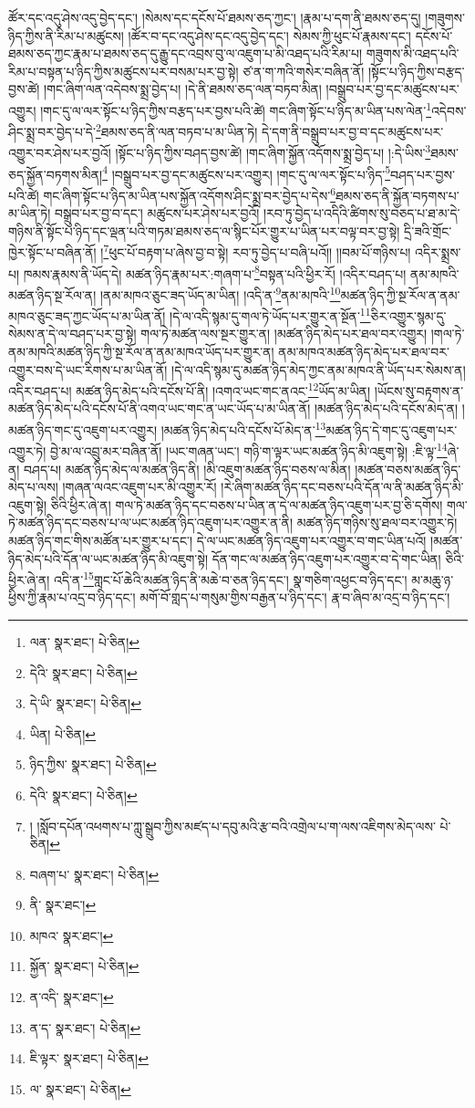 ཚོར་དང་འདུ་ཤེས་འདུ་བྱེད་དང་། །སེམས་དང་དངོས་པོ་ཐམས་ཅད་ཀྱང་། །རྣམ་པ་དག་ནི་ཐམས་ཅད་དུ། །གཟུགས་ཉིད་ཀྱིས་ནི་རིམ་པ་མཚུངས། །ཚོར་བ་དང་འདུ་ཤེས་དང་འདུ་བྱེད་དང་། སེམས་ཀྱི་ཕུང་པོ་རྣམས་དང་། དངོས་པོ་ཐམས་ཅད་ཀྱང་རྣམ་པ་ཐམས་ཅད་དུ་རྒྱུ་དང་འབྲས་བུ་ལ་འཇུག་པ་མི་འཐད་པའི་རིམ་པ། གཟུགས་མི་འཐད་པའི་རིམ་པ་བསྟན་པ་ཉིད་ཀྱིས་མཚུངས་པར་བསམ་པར་བྱ་སྟེ། ཙ་ན་ག་ཀའི་གསེར་བཞིན་ནོ། །སྟོང་པ་ཉིད་ཀྱིས་བརྩད་བྱས་ཚེ། །གང་ཞིག་ལན་འདེབས་སྨྲ་བྱེད་པ། །དེ་ནི་ཐམས་ཅད་ལན་བཏབ་མིན། །བསྒྲུབ་པར་བྱ་དང་མཚུངས་པར་འགྱུར། །གང་དུ་ལ་ལར་སྟོང་པ་ཉིད་ཀྱིས་བརྩད་པར་བྱས་པའི་ཚེ། གང་ཞིག་སྟོང་པ་ཉིད་མ་ཡིན་པས་ལེན་\footnote{ལན་  སྣར་ཐང་།  པེ་ཅིན། }འདེབས་ཤིང་སྨྲ་བར་བྱེད་པ་དེ་\footnote{དེའི་  སྣར་ཐང་།  པེ་ཅིན། }ཐམས་ཅད་ནི་ལན་བཏབ་པ་མ་ཡིན་ཏེ། དེ་དག་ནི་བསྒྲུབ་པར་བྱ་བ་དང་མཚུངས་པར་འགྱུར་བར་ཤེས་པར་བྱའོ། །སྟོང་པ་ཉིད་ཀྱིས་བཤད་བྱས་ཚེ། །གང་ཞིག་སྐྱོན་འདོགས་སྨྲ་བྱེད་པ། །:དེ་ཡིས་\footnote{དེ་ཡི་  སྣར་ཐང་།  པེ་ཅིན། }ཐམས་ཅད་སྐྱོན་བཏགས་མིན།\footnote{ཡིན།  པེ་ཅིན། } །བསྒྲུབ་པར་བྱ་དང་མཚུངས་པར་འགྱུར། །གང་དུ་ལ་ལར་སྟོང་པ་ཉིད་\footnote{ཉིད་ཀྱིས་  སྣར་ཐང་།  པེ་ཅིན། }བཤད་པར་བྱས་པའི་ཚེ། གང་ཞིག་སྟོང་པ་ཉིད་མ་ཡིན་པས་སྐྱོན་འདོགས་ཤིང་སྨྲ་བར་བྱེད་པ་དེས་\footnote{དེའི་  སྣར་ཐང་།  པེ་ཅིན། }ཐམས་ཅད་ནི་སྐྱོན་བཏགས་པ་མ་ཡིན་ཏེ། བསྒྲུབ་པར་བྱ་བ་དང་། མཚུངས་པར་ཤེས་པར་བྱའོ། །རབ་ཏུ་བྱེད་པ་འདིའི་ཚིགས་སུ་བཅད་པ་ཐ་མ་དེ་གཉིས་ནི་སྟོང་པ་ཉིད་དང་ལྡན་པའི་གཏམ་ཐམས་ཅད་ལ་སྙིང་པོར་གྱུར་པ་ཡིན་པར་བལྟ་བར་བྱ་སྟེ། དྲི་ཟའི་གྲོང་ཁྱེར་སྟོང་པ་བཞིན་ནོ། །\footnote{། །སློབ་དཔོན་འཕགས་པ་ཀླུ་སྒྲུབ་ཀྱིས་མཛད་པ་དབུ་མའི་རྩ་བའི་འགྲེལ་པ་ག་ལས་འཇིགས་མེད་ལས་  པེ་ཅིན། }ཕུང་པོ་བརྟག་པ་ཞེས་བྱ་བ་སྟེ། རབ་ཏུ་བྱེད་པ་བཞི་པའོ།། །།བམ་པོ་གཉིས་པ། འདིར་སྨྲས་པ། ཁམས་རྣམས་ནི་ཡོད་དེ། མཚན་ཉིད་རྣམ་པར་:གཞག་པ་\footnote{བཞག་པ་  སྣར་ཐང་།  པེ་ཅིན། }བསྟན་པའི་ཕྱིར་རོ། །འདིར་བཤད་པ། ནམ་མཁའི་མཚན་ཉིད་སྔ་རོལ་ན། །ནམ་མཁའ་ཅུང་ཟད་ཡོད་མ་ཡིན། །འདི་ན་\footnote{ནི་  སྣར་ཐང་། }ནམ་མཁའི་\footnote{མཁའ་  སྣར་ཐང་། }མཚན་ཉིད་ཀྱི་སྔ་རོལ་ན་ནམ་མཁའ་ཅུང་ཟད་ཀྱང་ཡོད་པ་མ་ཡིན་ནོ། །དེ་ལ་འདི་སྙམ་དུ་གལ་ཏེ་ཡོད་པར་གྱུར་ན་སྔོན་\footnote{སྐྱོན་  སྣར་ཐང་།  པེ་ཅིན། }ཅིར་འགྱུར་སྙམ་དུ་སེམས་ན་དེ་ལ་བཤད་པར་བྱ་སྟེ། གལ་ཏེ་མཚན་ལས་སྔར་གྱུར་ན། །མཚན་ཉིད་མེད་པར་ཐལ་བར་འགྱུར། །གལ་ཏེ་ནམ་མཁའི་མཚན་ཉིད་ཀྱི་སྔ་རོལ་ན་ནམ་མཁའ་ཡོད་པར་གྱུར་ན། ནམ་མཁའ་མཚན་ཉིད་མེད་པར་ཐལ་བར་འགྱུར་བས་དེ་ཡང་རིགས་པ་མ་ཡིན་ནོ། །དེ་ལ་འདི་སྙམ་དུ་མཚན་ཉིད་མེད་ཀྱང་ནམ་མཁའ་ནི་ཡོད་པར་སེམས་ན། འདིར་བཤད་པ། མཚན་ཉིད་མེད་པའི་དངོས་པོ་ནི། །འགའ་ཡང་གང་ནའང་\footnote{ན་འདི་  སྣར་ཐང་། }ཡོད་མ་ཡིན། །ཡོངས་སུ་བརྟགས་ན་མཚན་ཉིད་མེད་པའི་དངོས་པོ་ནི་འགའ་ཡང་གང་ན་ཡང་ཡོད་པ་མ་ཡིན་ནོ། །མཚན་ཉིད་མེད་པའི་དངོས་མེད་ན། །མཚན་ཉིད་གང་དུ་འཇུག་པར་འགྱུར། །མཚན་ཉིད་མེད་པའི་དངོས་པོ་མེད་ན་\footnote{ན་ད་  སྣར་ཐང་།  པེ་ཅིན། }མཚན་ཉིད་དེ་གང་དུ་འཇུག་པར་འགྱུར་ཏེ། བྱེ་མ་ལ་འབྲུ་མར་བཞིན་ནོ། །ཡང་གཞན་ཡང་། གཉི་ག་ལྟར་ཡང་མཚན་ཉིད་མི་འཇུག་སྟེ། :ཇི་ལྟ་\footnote{ཇི་ལྟར་  སྣར་ཐང་།  པེ་ཅིན། }ཞེ་ན། བཤད་པ། མཚན་ཉིད་མེད་ལ་མཚན་ཉིད་ནི། །མི་འཇུག་མཚན་ཉིད་བཅས་ལ་མིན། །མཚན་བཅས་མཚན་ཉིད་མེད་པ་ལས། །གཞན་ལའང་འཇུག་པར་མི་འགྱུར་རོ། །རེ་ཞིག་མཚན་ཉིད་དང་བཅས་པའི་དོན་ལ་ནི་མཚན་ཉིད་མི་འཇུག་སྟེ། ཅིའི་ཕྱིར་ཞེ་ན། གལ་ཏེ་མཚན་ཉིད་དང་བཅས་པ་ཡིན་ན་དེ་ལ་མཚན་ཉིད་འཇུག་པར་བྱ་ཅི་དགོས། གལ་ཏེ་མཚན་ཉིད་དང་བཅས་པ་ལ་ཡང་མཚན་ཉིད་འཇུག་པར་འགྱུར་ན་ནི། མཚན་ཉིད་གཉིས་སུ་ཐལ་བར་འགྱུར་ཏེ། མཚན་ཉིད་གང་གིས་མཚོན་པར་གྱུར་པ་དང་། དེ་ལ་ཡང་མཚན་ཉིད་འཇུག་པར་འགྱུར་བ་གང་ཡིན་པའོ། །མཚན་ཉིད་མེད་པའི་དོན་ལ་ཡང་མཚན་ཉིད་མི་འཇུག་སྟེ། དོན་གང་ལ་མཚན་ཉིད་འཇུག་པར་འགྱུར་བ་དེ་གང་ཡིན། ཅིའི་ཕྱིར་ཞེ་ན། འདི་ན་\footnote{ལ་  སྣར་ཐང་།  པེ་ཅིན། }གླང་པོ་ཆེའི་མཚན་ཉིད་ནི་མཆེ་བ་ཅན་ཉིད་དང་། སྣ་གཅིག་འཕྱང་བ་ཉིད་དང་། མ་མཆུ་ཉ་ཕྱིས་ཀྱི་རྣམ་པ་འདྲ་བ་ཉིད་དང་། མགོ་བོ་གླད་པ་གསུམ་གྱིས་བརྒྱན་པ་ཉིད་དང་། རྣ་བ་ཞིབ་མ་འདྲ་བ་ཉིད་དང་། 